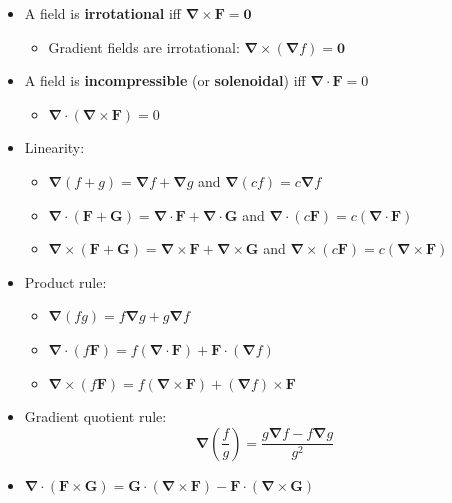 \begin{itemize}
    \item A field is \textbf{irrotational} iff $\bm{\nabla} \times \mathbf{F} = \mathbf{0}$
          \begin{itemize}
              \item Gradient fields are irrotational: $\bm{\nabla} \times (\bm{\nabla}f) = \mathbf{0}$
          \end{itemize}
    \item A field is \textbf{incompressible} (or \textbf{solenoidal}) iff $\bm{\nabla} \cdot \mathbf{F} = 0$
          \begin{itemize}
              \item $\bm{\nabla} \cdot (\bm{\nabla} \times \mathbf{F}) = 0$
          \end{itemize}
    \item Linearity:
          \begin{itemize}
              \item $\bm{\nabla}(f + g) = \bm{\nabla}f + \bm{\nabla}g$ and $\bm{\nabla}(cf) = c\bm{\nabla}f$
              \item $\bm{\nabla}\cdot(\mathbf{F} + \mathbf{G}) = \bm{\nabla}\cdot\mathbf{F} + \bm{\nabla}\cdot\mathbf{G}$ and $\bm{\nabla}\cdot(c\mathbf{F}) = c(\bm{\nabla}\cdot\mathbf{F})$
              \item $\bm{\nabla}\times(\mathbf{F} + \mathbf{G}) = \bm{\nabla}\times\mathbf{F} + \bm{\nabla}\times\mathbf{G}$ and $\bm{\nabla}\times(c\mathbf{F}) = c(\bm{\nabla}\times\mathbf{F})$
          \end{itemize}
    \item Product rule:
          \begin{itemize}
              \item $\bm{\nabla}(fg) = f\bm{\nabla}g + g\bm{\nabla}f$
              \item $\bm{\nabla} \cdot (f\mathbf{F}) = f(\bm{\nabla} \cdot \mathbf{F}) + \mathbf{F} \cdot (\bm{\nabla}f)$
              \item $\bm{\nabla} \times (f\mathbf{F}) = f(\bm{\nabla} \times \mathbf{F}) + (\bm{\nabla}f) \times \mathbf{F}$
          \end{itemize}
    \item Gradient quotient rule:
          \begin{equation*}
              \bm{\nabla}\left(\frac{f}{g}\right) = \frac{g\bm{\nabla}f - f\bm{\nabla}g}{g^2}
          \end{equation*}
    \item $\bm{\nabla} \cdot (\mathbf{F} \times \mathbf{G}) = \mathbf{G} \cdot (\bm{\nabla} \times \mathbf{F}) - \mathbf{F} \cdot (\bm{\nabla} \times \mathbf{G})$

\end{itemize}
